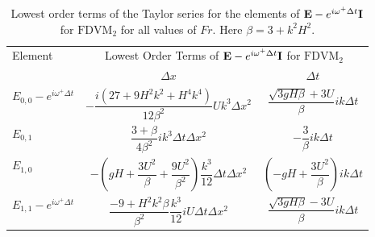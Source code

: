 \begin{table}
	\centering
	\begin{tabular}{l c c}
		\hline
		Element & \multicolumn{2}{c}{Lowest Order Terms of $\mathbf{E} - e^{i \omega^+ \Delta t} \mathbf{I}$ for $\text{FDVM}_2$}\T \B  \\
		\cline{2-3}
		& $\Delta x$&$\Delta t$\T \B  \\
		\hline
		$E_{0,0} -  e^{i \omega^+ \Delta t} $& $ -\dfrac{i \left(27 + 9H^2k^2 + H^4k^4\right)}{12\beta^2} U k^3 \Delta x^2$ & $\dfrac{\sqrt{3gH \beta} + 3U}{\beta} ik \Delta t$ \T \B  \\
		$E_{0,1}$& $ \dfrac{3 + \beta}{4 \beta^2}i k^3\Delta  t\Delta x^2$ &$ - \dfrac{3}{\beta} ik\Delta t$ \T \B \\
		$E_{1,0}$& $ -\left(gH + \dfrac{3U^2}{\beta} + \dfrac{9U^2}{\beta^2}\right)  \dfrac{k^3}{12}\Delta t\Delta x^2$ &$ \left(-gH + \dfrac{3U^2}{\beta}\right)ik \Delta t$ \T \B  \\
		$E_{1,1} -  e^{i \omega^+ \Delta t}$& $ \dfrac{-9 + H^2k^2\beta}{\beta^2} \dfrac{k^3}{12} i U \Delta t\Delta x^2$ & $\dfrac{\sqrt{3gH \beta} - 3U}{\beta} ik \Delta t$ \T \B  \\
		\hline 
	\end{tabular}
	\caption{Lowest order terms of the Taylor series for the elements of $\mathbf{E} - e^{i \omega^+ \Delta t} \mathbf{I}$ for $\text{FDVM}_2$ for all values of $Fr$. Here $\beta = 3 + k^2 H^2$.}
	\label{tab:EerrFDVM2} 
\end{table}

